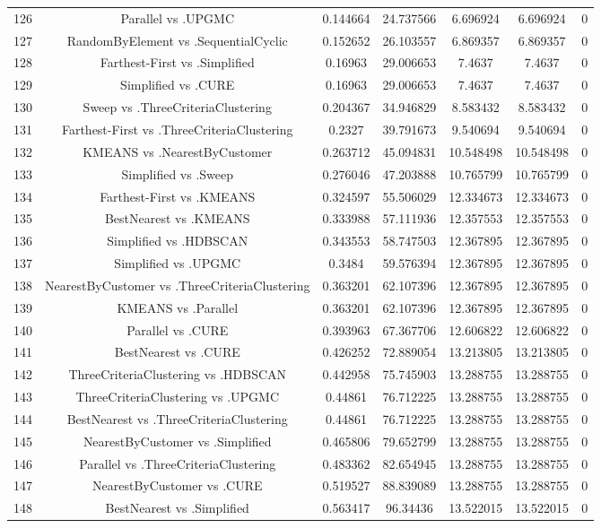 \documentclass[a4paper,10pt]{article}
\begin{document}
\begin{landscape}
\begin{table}[!htp]
\begin{tabular}{ccccccc}
126&Parallel vs .UPGMC&0.144664&24.737566&6.696924&6.696924&0\\
127&RandomByElement vs .SequentialCyclic&0.152652&26.103557&6.869357&6.869357&0\\
128&Farthest-First vs .Simplified&0.16963&29.006653&7.4637&7.4637&0\\
129&Simplified vs .CURE&0.16963&29.006653&7.4637&7.4637&0\\
130&Sweep vs .ThreeCriteriaClustering&0.204367&34.946829&8.583432&8.583432&0\\
131&Farthest-First vs .ThreeCriteriaClustering&0.2327&39.791673&9.540694&9.540694&0\\
132&KMEANS vs .NearestByCustomer&0.263712&45.094831&10.548498&10.548498&0\\
133&Simplified vs .Sweep&0.276046&47.203888&10.765799&10.765799&0\\
134&Farthest-First vs .KMEANS&0.324597&55.506029&12.334673&12.334673&0\\
135&BestNearest vs .KMEANS&0.333988&57.111936&12.357553&12.357553&0\\
136&Simplified vs .HDBSCAN&0.343553&58.747503&12.367895&12.367895&0\\
137&Simplified vs .UPGMC&0.3484&59.576394&12.367895&12.367895&0\\
138&NearestByCustomer vs .ThreeCriteriaClustering&0.363201&62.107396&12.367895&12.367895&0\\
139&KMEANS vs .Parallel&0.363201&62.107396&12.367895&12.367895&0\\
140&Parallel vs .CURE&0.393963&67.367706&12.606822&12.606822&0\\
141&BestNearest vs .CURE&0.426252&72.889054&13.213805&13.213805&0\\
142&ThreeCriteriaClustering vs .HDBSCAN&0.442958&75.745903&13.288755&13.288755&0\\
143&ThreeCriteriaClustering vs .UPGMC&0.44861&76.712225&13.288755&13.288755&0\\
144&BestNearest vs .ThreeCriteriaClustering&0.44861&76.712225&13.288755&13.288755&0\\
145&NearestByCustomer vs .Simplified&0.465806&79.652799&13.288755&13.288755&0\\
146&Parallel vs .ThreeCriteriaClustering&0.483362&82.654945&13.288755&13.288755&0\\
147&NearestByCustomer vs .CURE&0.519527&88.839089&13.288755&13.288755&0\\
148&BestNearest vs .Simplified&0.563417&96.34436&13.522015&13.522015&0\\

\end{tabular}
\end{table}
\end{landscape}
\end{document}
